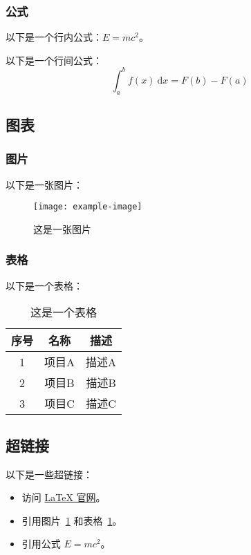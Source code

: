 \documentclass[aspectratio=169]{beamer}
\begin{document}
\subsubsection{公式}
\begin{frame}
以下是一个行内公式：\( E = m c^2 \)。

以下是一个行间公式：
\[
\int_{a}^{b} f(x)~\mathrm{d}x = F(b) - F(a)
\]
\end{frame}

\subsection{图表}
\subsubsection{图片}
\begin{frame}
以下是一张图片：
\begin{figure}[htbp]
\centering
\texttt{[image: example-image]} %
\caption{这是一张图片}\label{fig:example}
\end{figure}
\end{frame}

\subsubsection{表格}
\begin{frame}
以下是一个表格：
\begin{table}[htbp]
\centering
\begin{tabular}{ccc}
\toprule
序号 & 名称 & 描述 \\
\midrule
1 & 项目A & 描述A \\
2 & 项目B & 描述B \\
3 & 项目C & 描述C \\
\bottomrule
\end{tabular}
\caption{这是一个表格}\label{tab:example}
\end{table}
\end{frame}

\subsection{超链接}
\begin{frame}
以下是一些超链接：
\begin{itemize}
\item 访问 \href{https://www.latex-project.org/}{LaTeX 官网}。
\item 引用图片~\ref{fig:example} 和表格~\ref{tab:example}。
\item 引用公式 \( E = mc^2 \)。
\end{itemize}
\end{frame}
\end{document}

